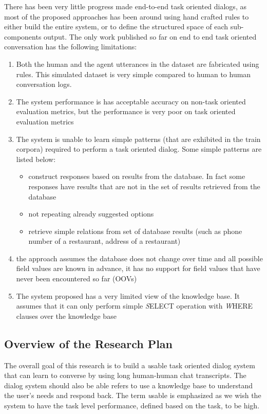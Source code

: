 There has been very little progress made end-to-end task oriented dialogs, as most of the proposed approaches has been around using hand crafted rules to either build the entire system, or to define the structured space of each sub-components output. The only work published so far on end to end task oriented conversation has the following limitations:
\begin{enumerate}
\item Both the human and the agent utterances in the dataset are fabricated using rules. This simulated dataset is very simple compared to human to human conversation logs.
\item The system performance is has acceptable accuracy on  non-task oriented evaluation metrics, but the performance is very poor on task oriented evaluation metrics
\item The system is unable to learn simple patterns (that are exhibited in the train corpora) required to perform a task oriented dialog. Some simple patterns are listed below:
\begin{itemize}
\item construct responses based on results from the database. In fact some responses have results that are not in the set of results retrieved from the database
\item not repeating already suggested options
\item retrieve simple relations from set of database results (such as phone number of a restaurant, address of a restaurant)
\end{itemize}  
\item the approach assumes the database does not change over time and all possible field values are known in advance, it has no support for field values that have never been encountered so far (OOVs)
\item The system proposed has a very limited view of the knowledge base. It assumes that it can only perform simple {\emph SELECT} operation with {\emph WHERE} clauses over the knowledge base
\end{enumerate} 

\subsection{Overview of the Research Plan}
\label{subsec:proposed-intro}
The overall goal of this research is to build a {\emph usable} task oriented dialog system that can learn to converse by using long human-human chat transcripts. The dialog system should also be able refers to use a knowledge base to understand the user’s needs and respond back. The term {\emph usable} is emphasized as we wish the system to have the task level performance, defined based on the task, to be high.

